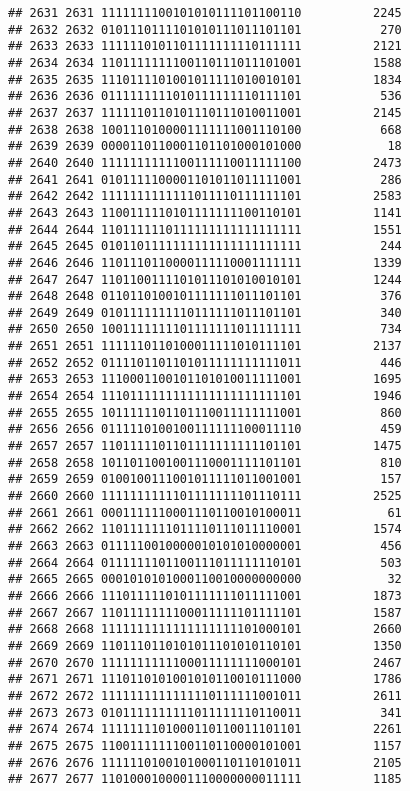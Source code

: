 \documentclass[]{article}
\begin{document}
\begin{verbatim}
## 2631 2631 1111111100101010111101100110          2245
## 2632 2632 0101110111101010111011101101           270
## 2633 2633 1111110101101111111110111111          2121
## 2634 2634 1101111111100110111011101001          1588
## 2635 2635 1110111101001011111010010101          1834
## 2636 2636 0111111111010111111110111101           536
## 2637 2637 1111110110101110111010011001          2145
## 2638 2638 1001110100001111111001110100           668
## 2639 2639 0000110110001101101000101000            18
## 2640 2640 1111111111100111110011111100          2473
## 2641 2641 0101111100001101011011111001           286
## 2642 2642 1111111111111011110111111101          2583
## 2643 2643 1100111110101111111100110101          1141
## 2644 2644 1101111110111111111111111111          1551
## 2645 2645 0101101111111111111111111111           244
## 2646 2646 1101110110000111110001111111          1339
## 2647 2647 1101100111101011101010010101          1244
## 2648 2648 0110110100101111111011101101           376
## 2649 2649 0101111111110111111011101101           340
## 2650 2650 1001111111101111111011111111           734
## 2651 2651 1111110110100011111010111101          2137
## 2652 2652 0111101101101011111111111011           446
## 2653 2653 1110001100101101010011111001          1695
## 2654 2654 1110111111111111111111111101          1946
## 2655 2655 1011111101101110011111111001           860
## 2656 2656 0111110100100111111100011110           459
## 2657 2657 1101111101101111111111101101          1475
## 2658 2658 1011011001001110001111101101           810
## 2659 2659 0100100111001011111011001001           157
## 2660 2660 1111111111101111111101110111          2525
## 2661 2661 0001111110001110110010100011            61
## 2662 2662 1101111111011110111011110001          1574
## 2663 2663 0111110010000010101010000001           456
## 2664 2664 0111111101100111011111110101           503
## 2665 2665 0001010101000110010000000000            32
## 2666 2666 1110111110101111111011111001          1873
## 2667 2667 1101111111100011111101111101          1587
## 2668 2668 1111111111111111111101000101          2660
## 2669 2669 1101110110101011101010110101          1350
## 2670 2670 1111111111100011111111000101          2467
## 2671 2671 1110110101001010110010111000          1786
## 2672 2672 1111111111111110111111001011          2611
## 2673 2673 0101111111111011111110110011           341
## 2674 2674 1111111101000110110011101101          2261
## 2675 2675 1100111111100110110000101001          1157
## 2676 2676 1111110100101000110110101011          2105
## 2677 2677 1101000100001110000000011111          1185

\end{verbatim}
\end{document}
